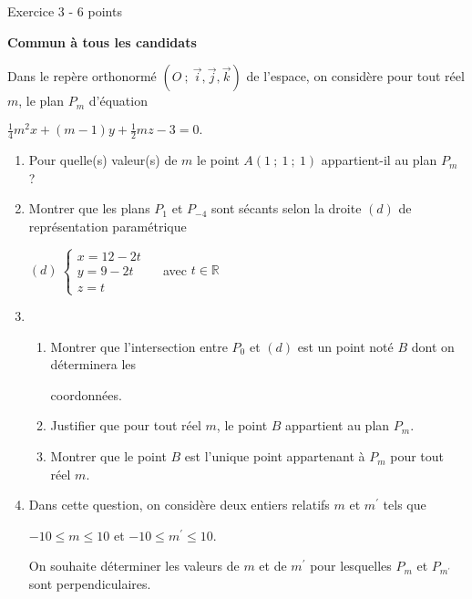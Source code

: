 
%
\begin{h2}Exercice 3 - 6 points\end{h2}
\textbf{Commun à tous les candidats}
\par
Dans le repère orthonormé $(O~;~\vec{i},\vec{j},\vec{k})$ de l'espace, on considère pour tout réel $m$, le plan $P_m$ d'équation
\begin{center}$\frac{1}{4} m^2x+(m-1)y+\frac{1}{2} mz-3 = 0.$\end{center}
\begin{enumerate}
     \item
     Pour quelle(s) valeur(s) de $m$ le point $A(1~;~1~;~1)$ appartient-il au plan $P_m$ ?
     \item
     Montrer que les plans $P_1$ et $P_{-4}$ sont sécants selon la droite $(d)$ de représentation paramétrique
     \begin{center}$(d) \ \begin{cases}  x = 12-2t \\ y = 9-2t  \\ z = t \end{cases} \quad$ avec $t \in \mathbb{R}$\end{center}
     \item
     \begin{enumerate}[label=\alph*.]
          \item
          Montrer que l'intersection entre $P_0$ et $(d)$ est un point noté $B$ dont on déterminera les
          \par
          coordonnées.
          \item
          Justifier que pour tout réel $m$, le point $B$ appartient au plan $P_m$.
          \item
          Montrer que le point $B$ est l'unique point appartenant à $P_m$ pour tout réel $m$.
     \end{enumerate}
     \item
     Dans cette question, on considère deux entiers relatifs $m$ et $m^\prime$ tels que
     \begin{center}$-10 \leqslant  m \leqslant 10$ et $-10 \leqslant m^\prime \leqslant 10$.\end{center}
     On souhaite déterminer les valeurs de $m$ et de $m^\prime$ pour lesquelles $P_m$ et $P_{m^\prime}$ sont perpendiculaires.
     \begin{enumerate}[label=\alph*.]

\end{enumerate}
\end{enumerate}
